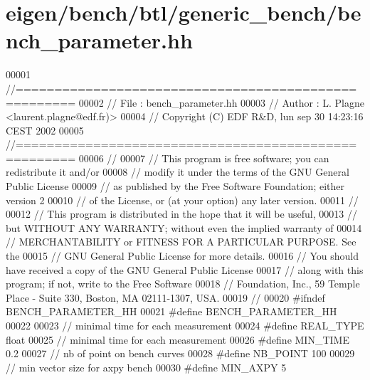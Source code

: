\hypertarget{eigen_2bench_2btl_2generic__bench_2bench__parameter_8hh_source}{}\section{eigen/bench/btl/generic\+\_\+bench/bench\+\_\+parameter.hh}
\label{eigen_2bench_2btl_2generic__bench_2bench__parameter_8hh_source}

\begin{DoxyCode}
00001 \textcolor{comment}{//=====================================================}
00002 \textcolor{comment}{// File   :  bench\_parameter.hh}
00003 \textcolor{comment}{// Author :  L. Plagne <laurent.plagne@edf.fr)>}
00004 \textcolor{comment}{// Copyright (C) EDF R&D,  lun sep 30 14:23:16 CEST 2002}
00005 \textcolor{comment}{//=====================================================}
00006 \textcolor{comment}{//}
00007 \textcolor{comment}{// This program is free software; you can redistribute it and/or}
00008 \textcolor{comment}{// modify it under the terms of the GNU General Public License}
00009 \textcolor{comment}{// as published by the Free Software Foundation; either version 2}
00010 \textcolor{comment}{// of the License, or (at your option) any later version.}
00011 \textcolor{comment}{//}
00012 \textcolor{comment}{// This program is distributed in the hope that it will be useful,}
00013 \textcolor{comment}{// but WITHOUT ANY WARRANTY; without even the implied warranty of}
00014 \textcolor{comment}{// MERCHANTABILITY or FITNESS FOR A PARTICULAR PURPOSE.  See the}
00015 \textcolor{comment}{// GNU General Public License for more details.}
00016 \textcolor{comment}{// You should have received a copy of the GNU General Public License}
00017 \textcolor{comment}{// along with this program; if not, write to the Free Software}
00018 \textcolor{comment}{// Foundation, Inc., 59 Temple Place - Suite 330, Boston, MA  02111-1307, USA.}
00019 \textcolor{comment}{//}
00020 \textcolor{preprocessor}{#ifndef BENCH\_PARAMETER\_HH}
00021 \textcolor{preprocessor}{#define BENCH\_PARAMETER\_HH}
00022 
00023 \textcolor{comment}{// minimal time for each measurement}
00024 \textcolor{preprocessor}{#define REAL\_TYPE float}
00025 \textcolor{comment}{// minimal time for each measurement}
00026 \textcolor{preprocessor}{#define MIN\_TIME 0.2}
00027 \textcolor{comment}{// nb of point on bench curves}
00028 \textcolor{preprocessor}{#define NB\_POINT 100}
00029 \textcolor{comment}{// min vector size for axpy bench}
00030 \textcolor{preprocessor}{#define MIN\_AXPY 5}

\end{DoxyCode}

